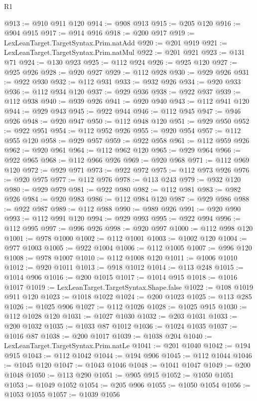 \begin{lexlean}{R1}
\begin{coremodule}
@913 := @910 @911 @120
@914 := @908 @913
@915 := @205 @120
@916 := @904 @915
@917 := @914 @916
@918 := @200 @917
@919 := LexLeanTarget.TargetSyntax.Prim.natAdd
@920 := @201 @919
@921 := LexLeanTarget.TargetSyntax.Prim.natMul
@922 := @201 @921
@923 := @131 @71
@924 := @130 @923
@925 := @112 @924
@926 := @925 @120
@927 := @925 @926
@928 := @920 @927
@929 := @112 @928
@930 := @929 @926
@931 := @922 @930
@932 := @112 @931
@933 := @932 @926
@934 := @920 @933
@936 := @112 @934 @120
@937 := @929 @936
@938 := @922 @937
@939 := @112 @938
@940 := @939 @926
@941 := @920 @940
@943 := @112 @941 @120
@944 := @929 @943
@945 := @922 @944
@946 := @112 @945
@947 := @946 @926
@948 := @920 @947
@950 := @112 @948 @120
@951 := @929 @950
@952 := @922 @951
@954 := @112 @952 @926
@955 := @920 @954
@957 := @112 @955 @120
@958 := @929 @957
@959 := @922 @958
@961 := @112 @959 @926
@962 := @920 @961
@964 := @112 @962 @120
@965 := @929 @964
@966 := @922 @965
@968 := @112 @966 @926
@969 := @920 @968
@971 := @112 @969 @120
@972 := @929 @971
@973 := @922 @972
@975 := @112 @973 @926
@976 := @920 @975
@977 := @112 @976
@978 := @113 @243
@979 := @932 @120
@980 := @929 @979
@981 := @922 @980
@982 := @112 @981
@983 := @982 @926
@984 := @920 @983
@986 := @112 @984 @120
@987 := @929 @986
@988 := @922 @987
@989 := @112 @988
@990 := @989 @926
@991 := @920 @990
@993 := @112 @991 @120
@994 := @929 @993
@995 := @922 @994
@996 := @112 @995
@997 := @996 @926
@998 := @920 @997
@1000 := @112 @998 @120
@1001 := @978 @1000
@1002 := @112 @1001
@1003 := @1002 @120
@1004 := @977 @1003
@1005 := @922 @1004
@1006 := @112 @1005
@1007 := @996 @120
@1008 := @978 @1007
@1010 := @112 @1008 @120
@1011 := @1006 @1010
@1012 := @920 @1011
@1013 := @918 @1012
@1014 := @113 @248
@1015 := @1014 @906
@1016 := @200 @1015
@1017 := @1014 @915
@1018 := @1016 @1017
@1019 := LexLeanTarget.TargetSyntax.Shape.false
@1022 := @108 @1019 @911 @120
@1023 := @1018 @1022
@1024 := @200 @1023
@1025 := @113 @285
@1026 := @1025 @906
@1027 := @112 @1026
@1028 := @1025 @915
@1030 := @112 @1028 @120
@1031 := @1027 @1030
@1032 := @203 @1031
@1033 := @200 @1032
@1035 := @1033 @87 @1012
@1036 := @1024 @1035
@1037 := @1016 @87
@1038 := @200 @1017
@1039 := @1038 @204
@1040 := LexLeanTarget.TargetSyntax.Prim.natLe
@1041 := @201 @1040
@1042 := @194 @915
@1043 := @112 @1042
@1044 := @194 @906
@1045 := @112 @1044
@1046 := @1045 @120
@1047 := @1043 @1046
@1048 := @1041 @1047
@1049 := @200 @1048
@1050 := @113 @290
@1051 := @905 @915
@1052 := @1050 @1051
@1053 := @1049 @1052
@1054 := @205 @906
@1055 := @1050 @1054
@1056 := @1053 @1055
@1057 := @1039 @1056

\end{coremodule}
\end{lexlean}
